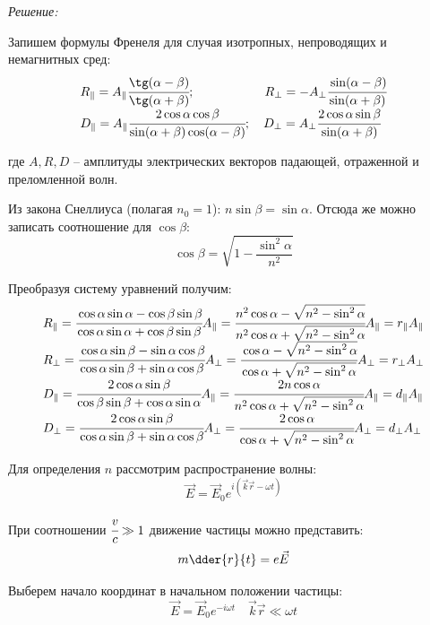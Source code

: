 \emph{Решение:}

Запишем формулы Френеля для случая изотропных, непроводящих и немагнитных 
сред:
\[
	\begin{array}{ll}
		R_{\Vert} = A_{\Vert}\cfrac{\tg(\alpha-\beta)}{\tg(\alpha+\beta)};
		\hspace{13ex}
		R_{\bot} = -A_{\bot}\cfrac{\sin(\alpha-\beta)}{\sin(\alpha+\beta)} \\
		D_{\Vert} = A_{\Vert}\cfrac{2\cos\alpha\cos\beta}
			{\sin(\alpha+\beta)\cos(\alpha-\beta)};\quad
		D_{\bot} = A_{\bot}\cfrac{2\cos\alpha\sin\beta}{\sin(\alpha+\beta)}
	\end{array}
\]

где \( A, R, D \) -- амплитуды электрических векторов падающей, отраженной 
и преломленной волн.

Из закона Снеллиуса (полагая \( n_0 = 1 \)): \( n\sin\beta = \sin\alpha \). 
Отсюда же можно записать соотношение для \( \cos\beta \):
\[
	\cos\beta = \sqrt{1-\frac{\sin^2\alpha}{n^2}}
\]

Преобразуя систему уравнений получим:
\[
	\begin{array}{ll}
		R_{\Vert} = \cfrac{\cos\alpha\sin\alpha - \cos\beta\sin\beta}
			{\cos\alpha\sin\alpha + \cos\beta\sin\beta}A_{\Vert} = 
			\cfrac{n^2\cos\alpha - \sqrt{n^2-\sin^2\alpha}}
			{n^2\cos\alpha + \sqrt{n^2-\sin^2\alpha}} A_{\Vert} = 
			r_{\Vert} A_{\Vert} \\
		R_{\bot} = \cfrac{\cos\alpha\sin\beta - \sin\alpha\cos\beta}
			{\cos\alpha\sin\beta + \sin\alpha\cos\beta}A_{\bot} = 
			\cfrac{\cos\alpha - \sqrt{n^2-\sin^2\alpha}}
			{\cos\alpha + \sqrt{n^2-\sin^2\alpha}}A_{\bot} = 
			r_{\bot} A_{\bot} \\
		D_{\Vert} = \cfrac{2\cos\alpha\sin\beta}
			{\cos\beta\sin\beta + \cos\alpha\sin\alpha}A_{\Vert} = 
			\cfrac{2n\cos\alpha}{n^2\cos\alpha + \sqrt{n^2-\sin^2\alpha}}
			A_{\Vert} = d_{\Vert} A_{\Vert} \\
		D_{\bot} = \cfrac{2\cos\alpha\sin\beta}
			{\cos\alpha\sin\beta + \sin\alpha\cos\beta}A_{\bot} =
			\cfrac{2\cos\alpha}{\cos\alpha + \sqrt{n^2-\sin^2\alpha}}
			A_{\bot} = d_{\bot} A_{\bot}
	\end{array}
\]

Для определения \( n \) рассмотрим распространение волны:
\[
	\vec{E} = \vec{E}_0 e^{i(\vec{k}\vec{r} - \omega t)}
\]

При соотношении \( \cfrac{v}{c} \gg 1 \) движение частицы можно представить:
\[
	m\dder{r}{t} = e\vec{E}
\]

Выберем начало координат в начальном положении частицы:
\[
	\vec{E} = \vec{E}_0 e^{-i\omega t} \quad \vec{k}\vec{r} \ll \omega t
\]

